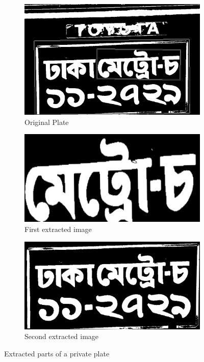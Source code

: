 \begin{figure}
\begin{subfigure}{0.33\textwidth}
    \centering
    \includegraphics[width=0.9\linewidth]{./img/experiment/stage.12/02-private}
    \caption{Original Plate}
\end{subfigure}
\begin{subfigure}{0.33\textwidth}
    \centering
    \includegraphics[width=0.9\linewidth]{./img/experiment/stage.13/00-02-private}
    \caption{First extracted image}
\end{subfigure}
\begin{subfigure}{0.33\textwidth}
    \centering
    \includegraphics[width=0.9\linewidth]{./img/experiment/stage.13/01-02-private}
    \caption{Second extracted image}
\end{subfigure}
\caption{Extracted parts of a private plate}
\label{fig:ExtractedResult4}
\end{figure}



